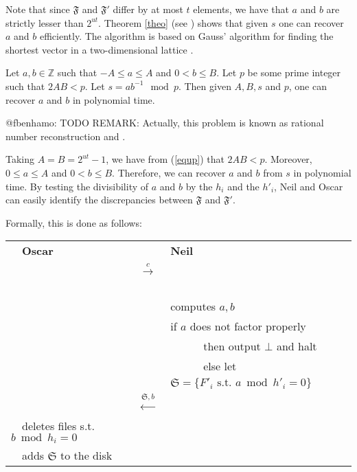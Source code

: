 \documentclass[11pt]{llncs}
\begin{document}
Note that since $\mathfrak{F}$ and $\mathfrak{F}'$ differ by at most $t$ elements, we have that $a$ and $b$ are strictly lesser than $2^{ut}$. Theorem \ref{theo} (see \cite{cryptorational}) shows that given $s$ one can recover $a$ and $b$ efficiently. The algorithm is based on Gauss' algorithm for finding the shortest vector in a two-dimensional lattice \cite{vallee}.

\begin{theorem}
\label{theo}
Let $a,b \in {\mathbb Z}$ such that $-A \leq a \leq A$ and $0<b \leq B$. Let $p$ be some prime integer such that
$2AB<p$. Let $s=a b^{-1} \mod p$.
Then given $A,B,s$ and $p$, one can recover $a$ and $b$ in polynomial time.
\end{theorem}

@fbenhamo: TODO REMARK: Actually, this problem is known as rational number reconstruction \cite{pan2004rational} and \cite{wang2003acceleration}.

Taking $A=B=2^{ut}-1$, we have from (\ref{equp}) that $2AB<p$. Moreover, $0 \leq a \leq A$ and $0 <b \leq B$. Therefore, we can
recover $a$ and $b$ from $s$ in polynomial time. By testing the divisibility of $a$ and $b$ by the $h_i$ and the $h'_i$, Neil and Oscar can
easily identify the discrepancies between $\mathfrak{F}$ and $\mathfrak{F}'$.\smallskip

Formally, this is done as follows:\smallskip

\begin{center}
\begin{tabular}{|lcl|}\hline
~~{\bf Oscar}                       &                                                      &   {\bf Neil}~\\
                                   &~~{{\LARGE $\stackrel{c}{\longrightarrow}$}}~~        &   \\
                                   &                                                      &computes $a,b$~\\
                                   &                                                      &if $a$ does not factor properly~\\
                                   &                                                      &~~~~~~then output $\bot$ and halt~\\
                                   &                                                      &~~~~~~else let $\mathfrak{S}=\{F'_i \mbox{~s.t.~} a \bmod h'_i =0\}$~~\\
                                   &~~{\LARGE $\stackrel{\mathfrak{S},b}{\longleftarrow}$}&\\
~~deletes files s.t. $b \bmod h_i =0$&                                                      &\\
~~adds $\mathfrak{S}$ to the disk    &                                                      &\\\hline
\end{tabular}
\end{center}
\end{document}
